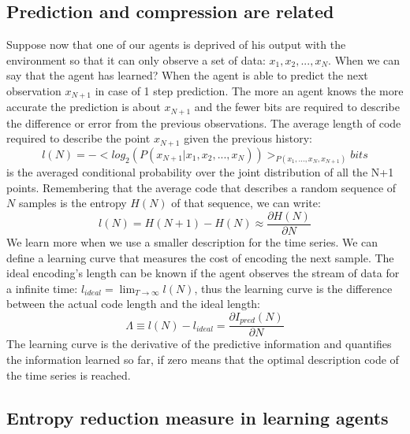 \subsection{Prediction and compression are related}
Suppose now that one of our agents is deprived of his output with the environment
 so that it can only observe a set of data: $x_{1},x_{2},...,x_{N}$. When we can
 say that the agent has learned? When the agent is able to predict the next
observation $x_{N+1}$ in case of 1 step prediction. The more an agent knows
the more accurate the prediction is about $x_{N+1}$ and the fewer bits are
required to describe the difference or error from the previous observations.
The average length of code required to describe the point $x_{N+1}$ given
the previous history:
\begin{equation}
 l(N)=-<log_2(P(x_{N+1}|x_1,x_2,...,x_N))>_{P(x_1,...,x_N,x_{N+1})} bits
\end{equation}
is the averaged conditional probability over the joint distribution of all the
 N+1 points. Remembering that the average code that describes a random sequence
 of $N$ samples is the entropy $H(N)$ of that sequence, we can write:
\begin{equation}
 l(N)=H(N+1)-H(N)\approx \frac{\partial H(N)}{\partial N}
\end{equation}
We learn more when we use a smaller description for the time series.
We can define a learning curve that measures the cost of encoding the next sample.
The ideal encoding's length can be known if the agent observes the stream of
 data for a infinite time:
$l_{ideal}=\lim_{T\rightarrow \infty} l(N)$,
thus the learning curve is the difference between the actual code length and the ideal length:
\begin{equation}
\varLambda \equiv l(N)-l_{ideal}=\frac{\partial I_{pred}(N)}{\partial N}
\end{equation}
The learning curve is the derivative of the predictive information and quantifies the
information learned so far, if zero means that the optimal description code of the time series
is reached.

\subsection{Entropy reduction measure in learning agents \label{Conclusion:PredictiveBayes}}

